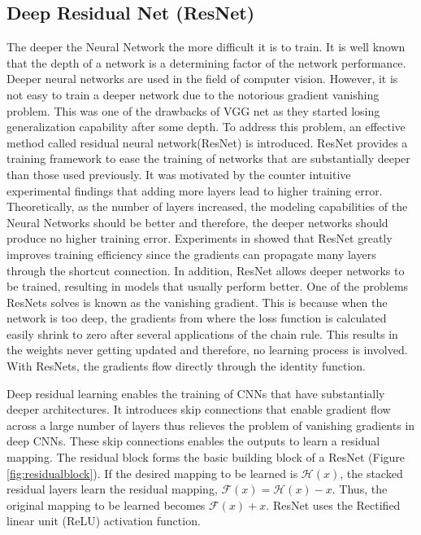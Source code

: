 \documentclass[a4paper]{article}
\begin{document}
\subsection{Deep Residual Net (ResNet)}
    The deeper the Neural Network the more difficult it is to train. It is well known that the depth of a network is a determining factor of the network performance. Deeper neural networks are used in the field of computer vision. However, it is not easy to train a deeper network due to the notorious gradient vanishing problem. This was one of the drawbacks of VGG net \cite{vggnet} as they started losing generalization capability after some depth. To address this problem, an effective method called residual neural network(ResNet)\cite{resnet} is introduced. ResNet provides a training framework to ease the training of networks that are substantially deeper than those used previously. It was motivated by the counter intuitive experimental findings that adding more layers lead to higher training error. Theoretically, as the number of layers increased, the modeling capabilities of the Neural Networks should be better and therefore, the deeper networks should produce no higher training error. Experiments in \cite{resnet} showed that ResNet greatly improves training efficiency since the gradients can propagate many layers through the shortcut connection. In addition, ResNet allows deeper networks to be trained, resulting in models that usually perform better.
One of the problems ResNets solves is known as the vanishing gradient. This is because when the network is too deep, the gradients from where the loss function is calculated easily shrink to zero after several applications of the chain rule. This results in the weights never getting updated and therefore, no learning process is involved. With ResNets, the gradients flow directly through the identity function.
    
    Deep residual learning \cite{resnet} enables the training of CNNs that have substantially deeper architectures. It introduces skip connections that enable gradient flow across a large number of layers thus relieves the problem of vanishing gradients in deep CNNs. These skip connections enables the outputs to learn a residual mapping. The residual block forms the basic building block of a ResNet (Figure \ref{fig:residualblock}). If the desired mapping to be learned is $\mathcal{H}(x)$, the stacked residual layers learn the residual mapping, $\mathcal{F}(x) = \mathcal{H}(x) - x$. Thus, the original mapping to be learned becomes $\mathcal{F}(x) + x$.  ResNet uses the Rectified linear unit (ReLU) activation function.
    
\end{document}
